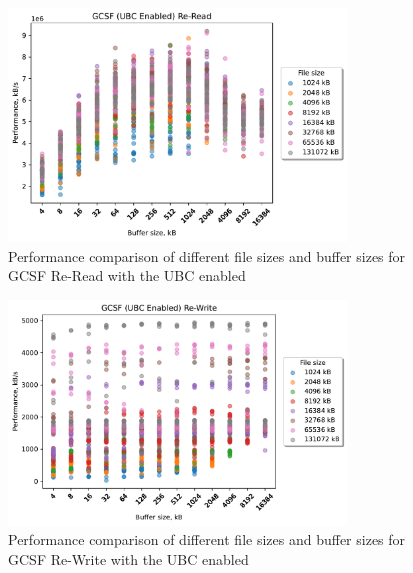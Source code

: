 \begin{figure}[!htb]
	\label{fig:bench_gcsf_no_ubc_scatter_re-read}
	\begin{center}
		\includegraphics[width=0.8\textwidth]{figures.nosync/benchmarking/GCSF/scatter-UBC Enabled-Re-Read.pdf}
	\end{center}
	\caption[Comparison of Re-Read performance for file size and buffer size for GCSF with the UBC disabled]{Performance comparison of different file sizes and buffer sizes for GCSF Re-Read with the UBC enabled}
\end{figure}
\begin{figure}[!htb]
	\label{fig:bench_gcsf_no_ubc_scatter_re-write}
	\begin{center}
		\includegraphics[width=0.8\textwidth]{figures.nosync/benchmarking/GCSF/scatter-UBC Enabled-Re-Write.pdf}
	\end{center}
	\caption[Comparison of Re-Write performance for file size and buffer size for GCSF with the UBC disabled]{Performance comparison of different file sizes and buffer sizes for GCSF Re-Write with the UBC enabled}
\end{figure}
\clearpage
